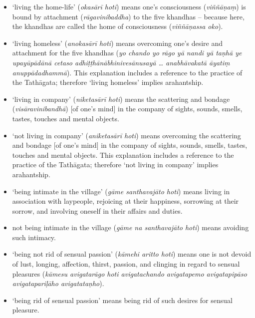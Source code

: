 \begin{itemize}

\item `living the home-life' (\textit{okasārī hoti}) means one's consciousness (\textit{viññāṇaṃ}) is bound by attachment (\textit{rāgavinibaddha}) to the five khandhas -- because here, the khandhas are called the home of consciousness (\textit{viññāṇassa oko}).

\item `living homeless' (\textit{anokasārī hoti}) means overcoming one's desire and attachment for the five khandhas (\textit{yo chando yo rāgo yā nandi yā taṇhā ye upayūpādānā cetaso adhiṭṭhānābhinivesānusayā \ldots{} anabhāvakatā āyatiṃ anuppādadhammā}). This explanation includes a reference to the practice of the Tathāgata; therefore `living homeless' implies arahantship.

\item `living in company' (\textit{niketasārī hoti}) means the scattering and bondage (\textit{visāravinibandhā}) [of one's mind] in the company of sights, sounds, smells, tastes, touches and mental objects.

\item `not living in company' (\textit{aniketasārī hoti}) means overcoming the scattering and bondage [of one's mind] in the company of sights, sounds, smells, tastes, touches and mental objects. This explanation includes a reference to the practice of the Tathāgata; therefore `not living in company' implies arahantship.

\item `being intimate in the village' (\textit{gāme santhavajāto hoti}) means living in association with laypeople, rejoicing at their happiness, sorrowing at their sorrow, and involving oneself in their affairs and duties.

\item not being intimate in the village (\textit{gāme na santhavajāto hoti}) means avoiding such intimacy.

\item `being not rid of sensual passion' (\textit{kāmehi aritto hoti}) means one is not devoid of lust, longing, affection, thirst, passion, and clinging in regard to sensual pleasures (\textit{kāmesu avigatarāgo hoti avigatachando avigatapemo avigatapipāso avigatapariḷāho avigatataṇho}).

\item `being rid of sensual passion' means being rid of such desires for sensual pleasure.


\end{itemize}
